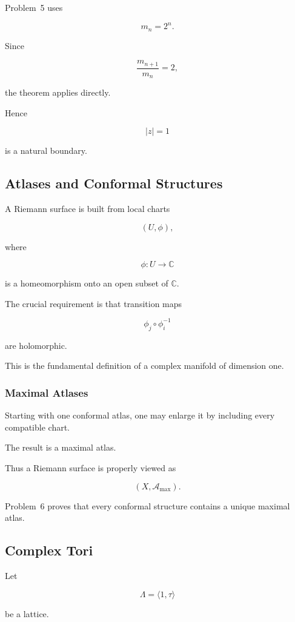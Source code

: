 \documentclass[12pt,a4paper]{article}
\theoremstyle{notespace}
\begin{document}
Problem~5 uses

\[
m_n=2^n.
\]

Since

\[
\frac{m_{n+1}}{m_n}=2,
\]

the theorem applies directly.

Hence

\[
|z|=1
\]

is a natural boundary.

\bigskip

\subsection{ Atlases and Conformal Structures}

A Riemann surface is built from local charts

\[
(U,\phi),
\]

where

\[
\phi:U\to\mathbb C
\]

is a homeomorphism onto an open subset of \(\mathbb C\).

The crucial requirement is that transition maps

\[
\phi_j\circ\phi_i^{-1}
\]

are holomorphic.

This is the fundamental definition of a complex manifold of dimension one.

\subsubsection*{Maximal Atlases}

Starting with one conformal atlas, one may enlarge it by including every compatible chart.

The result is a maximal atlas.

Thus a Riemann surface is properly viewed as

\[
(X,\mathcal A_{\max}).
\]

Problem~6 proves that every conformal structure contains a unique maximal atlas.

\bigskip

\subsection{ Complex Tori}

Let

\[
\Lambda
=
\langle1,\tau\rangle
\]

be a lattice.
\end{document}
